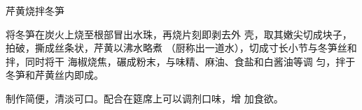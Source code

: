 \begin{recipe}{芹黄烧拌冬笋}

\ingredients


\cooking

将冬笋在炭火上烧至根部冒出水珠，再烧片刻即剥去外 壳，取其嫩尖切成块子，拍破，撕成丝条状，芹黄以沸水略煮 （厨称出一道水），切成寸长小节与冬笋丝和拌，同时将干 海椒烧焦，碾成粉末，与味精、麻油、食盐和白酱油等调 匀，拌于冬笋和芹黄丝内即成。

\notes

制作简便，清淡可口。配合在筵席上可以调剂口味，增 加食欲。

\end{recipe}

